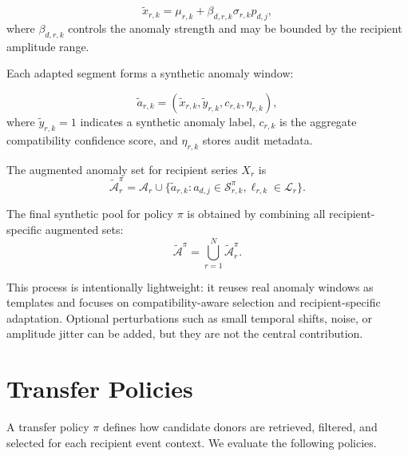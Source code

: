 \documentclass[conference]{IEEEtran}
\begin{document}
\[
\tilde{x}_{r,k} = \mu_{r,k} + \beta_{d,r,k}\sigma_{r,k} p_{d,j},
\]
where $\beta_{d,r,k}$ controls the anomaly strength and may be bounded by the
recipient amplitude range.

Each adapted segment forms a synthetic anomaly window:

\[
\tilde{a}_{r,k} = (\tilde{x}_{r,k}, \tilde{y}_{r,k}, c_{r,k}, \eta_{r,k}),
\]
where $\tilde{y}_{r,k}=1$ indicates a synthetic anomaly label, $c_{r,k}$ is
the aggregate compatibility confidence score, and $\eta_{r,k}$ stores audit
metadata.

The augmented anomaly set for recipient series $X_r$ is
\[
\widetilde{\mathcal{A}}_r^{\pi} =
\mathcal{A}_r \cup \{\tilde{a}_{r,k} : a_{d,j} \in \mathcal{S}_{r,k}^{\pi}, 
\ell_{r,k} \in \mathcal{L}_r \}.
\]

The final synthetic pool for policy $\pi$ is obtained by combining all
recipient-specific augmented sets:
\[
\widetilde{\mathcal{A}}^{\pi} =
\bigcup_{r=1}^{N} \widetilde{\mathcal{A}}_r^{\pi}.
\]

This process is intentionally lightweight: it reuses real anomaly windows as
templates and focuses on compatibility-aware selection and recipient-specific
adaptation. Optional perturbations such as small temporal shifts, noise, or
amplitude jitter can be added, but they are not the central contribution.

\section{Transfer Policies}
\label{sec:policies}

A transfer policy $\pi$ defines how candidate donors are retrieved, filtered, and selected for each recipient event context. We evaluate the following policies.
\end{document}
